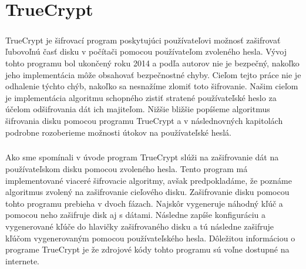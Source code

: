 \chapter{TrueCrypt}
\paragraph{}
TrueCrypt je šifrovací program poskytujúci používateľovi možnosť zašifrovať ľubovoľnú časť disku v počítači pomocou používateľom zvoleného hesla. Vývoj tohto programu bol ukončený roku 2014 a podľa autorov nie je bezpečný, nakoľko jeho implementácia môže obsahovať bezpečnostné chyby. Cieľom tejto práce nie je odhalenie týchto chýb, nakoľko sa nesnažíme zlomiť toto šifrovanie. Našim cieľom je implementácia algoritmu schopného zistiť stratené používateľské heslo za účelom odšifrovania dát ich majiteľom. Nižšie bližšie popíšeme algoritmus šifrovania disku pomocou programu TrueCrypt a v následnovných kapitolách podrobne rozoberieme možnosti útokov na používateľské heslá.

\paragraph{}
Ako sme spomínali v úvode program TrueCrypt slúži na zašifrovanie dát na používateľskom disku pomocou zvoleného hesla. Tento program má implementované viaceré šifrovacie algoritmy, avšak predpokladáme, že poznáme algoritmus zvolený na zašifrovanie cieľového disku.  Zašifrovanie disku pomocou tohto programu prebieha v dvoch fázach. Najskôr vygeneruje náhodný kľúč a pomocou neho zašifruje disk aj s dátami. Následne zapíše konfiguráciu a vygenerované kľúče do hlavičky zašifrovaného disku a tú následne zašifruje kľúčom vygenerovaným pomocou používateľského hesla. Dôležitou informáciou o programe TrueCrypt je že zdrojové kódy tohto programu sú voľne dostupné na internete.